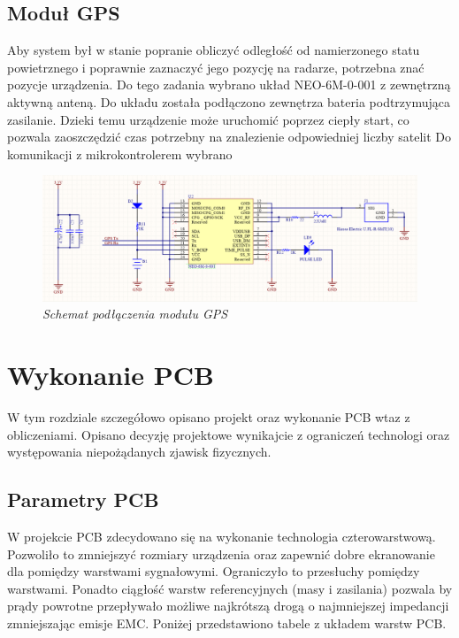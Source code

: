 \documentclass[eng,printmode]{mgr}
\begin{document}
\subsection*{Moduł GPS}
Aby system był w stanie popranie obliczyć odległość od namierzonego statu powietrznego i poprawnie zaznaczyć jego pozycję na radarze, potrzebna znać pozycje urządzenia. Do tego zadania wybrano układ NEO-6M-0-001 z zewnętrzną aktywną anteną. Do układu została podłączono zewnętrza bateria podtrzymująca zasilanie. Dzieki temu urządzenie może uruchomić poprzez ciepły start, co pozwala zaoszczędzić czas potrzebny na znalezienie odpowiedniej liczby satelit Do komunikacji z mikrokontrolerem wybrano 
\begin{figure}[!h]
    \centering
    \includegraphics[width=\textwidth]{schematics/gps.png}
    \caption{\textit{ Schemat podłączenia modułu GPS}}
\end{figure}
\newpage

\section{ Wykonanie PCB }
W tym rozdziale szczegółowo opisano projekt oraz wykonanie PCB wtaz z obliczeniami. Opisano decyzję projektowe wynikajcie z ograniczeń technologi oraz występowania niepożądanych zjawisk fizycznych.

\subsection*{Parametry PCB} \label{pcbSection}
W projekcie PCB zdecydowano się na wykonanie technologia czterowarstwową. Pozwoliło to zmniejszyć rozmiary urządzenia oraz zapewnić dobre ekranowanie dla pomiędzy warstwami sygnałowymi. Ograniczyło to przesłuchy pomiędzy warstwami. Ponadto ciągłość warstw referencyjnych (masy i zasilania) pozwala by prądy powrotne przepływało możliwe najkrótszą drogą o najmniejszej impedancji zmniejszając emisje EMC. Poniżej przedstawiono tabele z układem warstw PCB.
\end{document}

